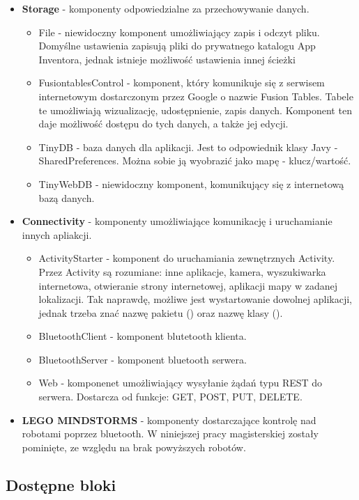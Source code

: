 \begin{itemize}
\item \textbf{Storage} - komponenty odpowiedzialne za przechowywanie danych.
\begin{itemize}
\item File - niewidoczny komponent umożliwiający zapis i odczyt pliku. Domyślne ustawienia zapisują pliki do prywatnego katalogu App Inventora, jednak istnieje możliwość ustawienia innej ścieżki
\item FusiontablesControl - komponent, który komunikuje się z serwisem internetowym dostarczonym przez Google o nazwie Fusion Tables. Tabele te umożliwiają wizualizację, udostępnienie, zapis danych. Komponent ten daje możliwość dostępu do tych danych, a także jej edycji.
\item TinyDB - baza danych dla aplikacji. Jest to odpowiednik klasy Javy - SharedPreferences. Można sobie ją wyobrazić jako mapę - klucz/wartość.
\item TinyWebDB - niewidoczny komponent, komunikujący się z internetową bazą danych.
\end{itemize}

\item \textbf{Connectivity} - komponenty umożliwiające komunikację i uruchamianie innych apliakcji.
\begin{itemize}
\item ActivityStarter - komponent do uruchamiania zewnętrznych Activity. Przez Activity są rozumiane: inne aplikacje, kamera, wyszukiwarka internetowa, otwieranie strony internetowej, aplikacji mapy w zadanej lokalizacji. Tak naprawdę, możliwe jest wystartowanie dowolnej aplikacji, jednak trzeba znać nazwę pakietu () oraz nazwę klasy ().
\item BluetoothClient - komponent blutetooth klienta.
\item BluetoothServer - komponent bluetooth serwera.
\item Web - komponenet umożliwiający wysyłanie żądań typu REST do serwera. Dostarcza od funkcje: GET, POST, PUT, DELETE.
\end{itemize}

\item \textbf{LEGO MINDSTORMS} - komponenty dostarczające kontrolę nad robotami poprzez bluetooth. W niniejszej pracy magisterskiej zostały pominięte, ze względu na brak powyższych robotów.
\end{itemize}

\subsection{Dostępne bloki}

